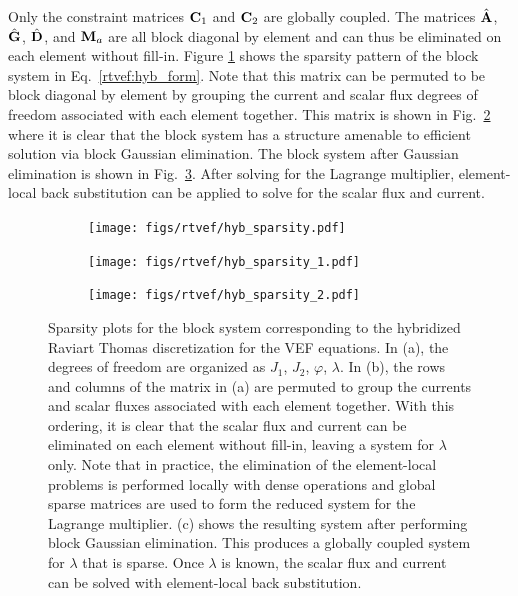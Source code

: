 \documentclass[../doc.tex]{subfiles}
\begin{document}
Only the constraint matrices $\boldsymbol{\mathrm{C}}_1$ and $\boldsymbol{\mathrm{C}}_2$ are globally coupled. The matrices $\hat{\boldsymbol{\mathrm{A}}}$, $\hat{\boldsymbol{\mathrm{G}}}$, $\hat{\boldsymbol{\mathrm{D}}}$, and $\boldsymbol{\mathrm{M}}_a$ are all block diagonal by element and can thus be eliminated on each element without fill-in. Figure \ref{fig:hyb_sparsity_a} shows the sparsity pattern of the block system in Eq.~\ref{rtvef:hyb_form}. Note that this matrix can be permuted to be block diagonal by element by grouping the current and scalar flux degrees of freedom associated with each element together. This matrix is shown in Fig.~\ref{fig:hyb_sparsity_b} where it is clear that the block system has a structure amenable to efficient solution via block Gaussian elimination. The block system after Gaussian elimination is shown in Fig.~\ref{fig:hyb_sparsity_c}. After solving for the Lagrange multiplier, element-local back substitution can be applied to solve for the scalar flux and current. 
\begin{figure}
	\centering
	\begin{subfigure}{.32\textwidth}
		\centering
		\texttt{[image: figs/rtvef/hyb\_sparsity.pdf]}
		\caption{}
		\label{fig:hyb_sparsity_a}
	\end{subfigure}
	\begin{subfigure}{.32\textwidth}
		\centering
		\texttt{[image: figs/rtvef/hyb\_sparsity\_1.pdf]}
		\caption{}
		\label{fig:hyb_sparsity_b}
	\end{subfigure}
	\begin{subfigure}{.32\textwidth}
		\centering
		\texttt{[image: figs/rtvef/hyb\_sparsity\_2.pdf]}
		\caption{}
		\label{fig:hyb_sparsity_c}
	\end{subfigure}	
	\caption{Sparsity plots for the block system corresponding to the hybridized Raviart Thomas discretization for the VEF equations. In (a), the degrees of freedom are organized as $J_1$, $J_2$, $\varphi$, $\lambda$. In (b), the rows and columns of the matrix in (a) are permuted to group the currents and scalar fluxes associated with each element together. With this ordering, it is clear that the scalar flux and current can be eliminated on each element without fill-in, leaving a system for $\lambda$ only. Note that in practice, the elimination of the element-local problems is performed locally with dense operations and global sparse matrices are used to form the reduced system for the Lagrange multiplier. (c) shows the resulting system after performing block Gaussian elimination. This produces a globally coupled system for $\lambda$ that is sparse. Once $\lambda$ is known, the scalar flux and current can be solved with element-local back substitution.}
	\label{fig:hyb_sparsity}
\end{figure}
\end{document}
